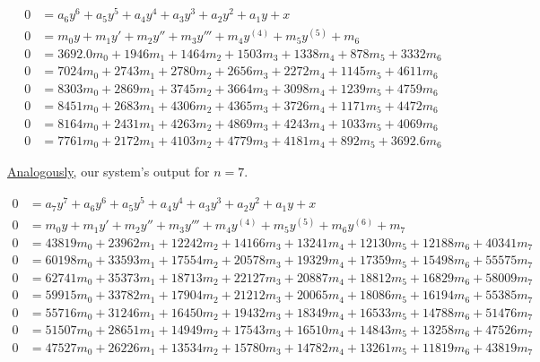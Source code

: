 \documentclass[12pt,a4paper]{article}
\begin{document}
\begin{align}
0 &= a_6 y^6 + a_5 y^5 + a_4 y^4 + a_3 y^3 + a_2 y^2 + a_1 y + x \\
0 &= m_0 y + m_1 y' + m_2 y'' + m_3 y''' + m_4 y^{(4)} + m_5 y^{(5)} + m_6 \\
0 &= 3692.0 m_0 + 1946 m_1 + 1464 m_2 + 1503 m_3 + 1338 m_4 + 878 m_5 + 3332 m_6 \\
0 &= 7024 m_0 + 2743 m_1 + 2780 m_2 + 2656 m_3 + 2272 m_4 + 1145 m_5 + 4611 m_6 \\
0 &= 8303 m_0 + 2869 m_1 + 3745 m_2 + 3664 m_3 + 3098 m_4 + 1239 m_5 + 4759 m_6 \\
0 &= 8451 m_0 + 2683 m_1 + 4306 m_2 + 4365 m_3 + 3726 m_4 + 1171 m_5 + 4472 m_6 \\
0 &= 8164 m_0 + 2431 m_1 + 4263 m_2 + 4869 m_3 + 4243 m_4 + 1033 m_5 + 4069 m_6 \\
0 &= 7761 m_0 + 2172 m_1 + 4103 m_2 + 4779 m_3 + 4181 m_4 +  892 m_5 + 3692.6 m_6
\end{align}

\vspace{3mm}

\href{http://boralaemcasa.herokuapp.com/anyDegree/7.zip}{\color{blue}\underline{Analogously}}, our system's output for $n = 7$.

\begin{align}
0 &= a_7 y^7 + a_6 y^6 + a_5 y^5 + a_4 y^4 + a_3 y^3 + a_2 y^2 + a_1 y + x \\
0 &= m_0 y + m_1 y' + m_2 y'' + m_3 y''' + m_4 y^{(4)} + m_5 y^{(5)} + m_6 y^{(6)} + m_7 \\
0 &= 43819 m_0 + 23962 m_1 + 12242 m_2 + 14166 m_3 + 13241 m_4 + 12130 m_5 + 12188 m_6 + 40341 m_7 \\
0 &= 60198 m_0 + 33593 m_1 + 17554 m_2 + 20578 m_3 + 19329 m_4 + 17359 m_5 + 15498 m_6 + 55575 m_7 \\
0 &= 62741 m_0 + 35373 m_1 + 18713 m_2 + 22127 m_3 + 20887 m_4 + 18812 m_5 + 16829 m_6 + 58009 m_7 \\
0 &= 59915 m_0 + 33782 m_1 + 17904 m_2 + 21212 m_3 + 20065 m_4 + 18086 m_5 + 16194 m_6 + 55385 m_7 \\
0 &= 55716 m_0 + 31246 m_1 + 16450 m_2 + 19432 m_3 + 18349 m_4 + 16533 m_5 + 14788 m_6 + 51476 m_7 \\
0 &= 51507 m_0 + 28651 m_1 + 14949 m_2 + 17543 m_3 + 16510 m_4 + 14843 m_5 + 13258 m_6 + 47526 m_7 \\
0 &= 47527 m_0 + 26226 m_1 + 13534 m_2 + 15780 m_3 + 14782 m_4 + 13261 m_5 + 11819 m_6 + 43819 m_7
\end{align}
\end{document}
